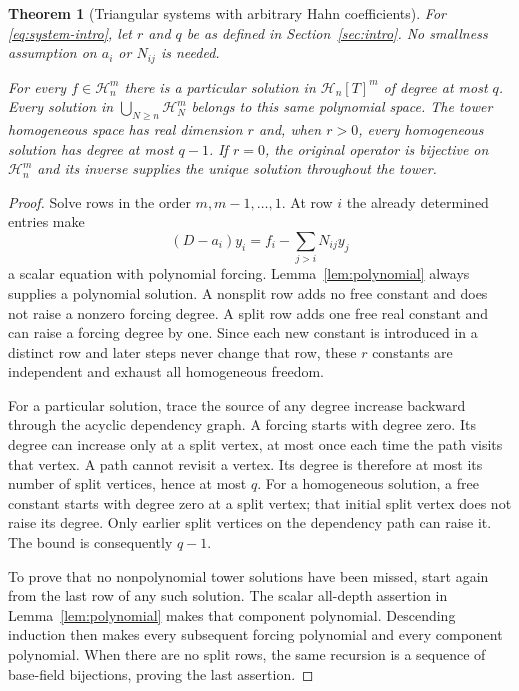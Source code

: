 \documentclass[11pt,a4paper]{article}
\numberwithin{equation}{section}
\newtheorem{theorem}{Theorem}[section]
\theoremstyle{definition}
\theoremstyle{remark}\newtheorem{remark}[theorem]{Remark}
\newcommand{\Hh}{\mathcal H}\newcommand{\Ll}{\mathcal L}
\begin{document}
\begin{theorem}[Triangular systems with arbitrary Hahn coefficients]
\label{thm:triangular}
For \eqref{eq:system-intro}, let $r$ and $q$ be as defined in Section~\ref{sec:intro}. No smallness assumption on $a_i$ or $N_{ij}$ is needed.

For every $f\in\Hh_n^m$ there is a particular solution in $\Hh_n[T]^m$ of degree at most $q$. Every solution in $\bigcup_{N\ge n}\Hh_N^m$ belongs to this same polynomial space. The tower homogeneous space has real dimension $r$ and, when $r>0$, every homogeneous solution has degree at most $q-1$. If $r=0$, the original operator is bijective on $\Hh_n^m$ and its inverse supplies the unique solution throughout the tower.
\end{theorem}
\begin{proof}
Solve rows in the order $m,m-1,\ldots,1$. At row $i$ the already determined entries make
\[
 (D-a_i)y_i=f_i-\sum_{j>i}N_{ij}y_j
\]
a scalar equation with polynomial forcing. Lemma~\ref{lem:polynomial} always supplies a polynomial solution. A nonsplit row adds no free constant and does not raise a nonzero forcing degree. A split row adds one free real constant and can raise a forcing degree by one. Since each new constant is introduced in a distinct row and later steps never change that row, these $r$ constants are independent and exhaust all homogeneous freedom.

For a particular solution, trace the source of any degree increase backward through the acyclic dependency graph. A forcing starts with degree zero. Its degree can increase only at a split vertex, at most once each time the path visits that vertex. A path cannot revisit a vertex. Its degree is therefore at most its number of split vertices, hence at most $q$. For a homogeneous solution, a free constant starts with degree zero at a split vertex; that initial split vertex does not raise its degree. Only earlier split vertices on the dependency path can raise it. The bound is consequently $q-1$.

To prove that no nonpolynomial tower solutions have been missed, start again from the last row of any such solution. The scalar all-depth assertion in Lemma~\ref{lem:polynomial} makes that component polynomial. Descending induction then makes every subsequent forcing polynomial and every component polynomial. When there are no split rows, the same recursion is a sequence of base-field bijections, proving the last assertion.
\end{proof}
\end{document}
